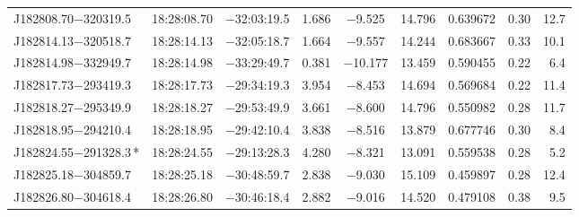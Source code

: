 \begin{table*}
\begin{tabular}{lcccccccr}
J182808.70$-$320319.5 & 18:28:08.70 & $-$32:03:19.5 &  1.686 & $-$9.525 & 14.796 & 0.639672 & 0.30 & 12.7 \\
J182814.13$-$320518.7 & 18:28:14.13 & $-$32:05:18.7 &  1.664 & $-$9.557 & 14.244 & 0.683667 & 0.33 & 10.1 \\
J182814.98$-$332949.7 & 18:28:14.98 & $-$33:29:49.7 &  0.381 & $-$10.177 & 13.459 & 0.590455 & 0.22 & 6.4 \\
J182817.73$-$293419.3 & 18:28:17.73 & $-$29:34:19.3 &  3.954 & $-$8.453 & 14.694 & 0.569684 & 0.22 & 11.4 \\
J182818.27$-$295349.9 & 18:28:18.27 & $-$29:53:49.9 &  3.661 & $-$8.600 & 14.796 & 0.550982 & 0.28 & 11.7 \\
J182818.95$-$294210.4 & 18:28:18.95 & $-$29:42:10.4 &  3.838 & $-$8.516 & 13.879 & 0.677746 & 0.30 & 8.4 \\
J182824.55$-$291328.3\,* & 18:28:24.55 & $-$29:13:28.3 &  4.280 & $-$8.321 & 13.091 & 0.559538 & 0.28 & 5.2 \\
J182825.18$-$304859.7 & 18:28:25.18 & $-$30:48:59.7 &  2.838 & $-$9.030 & 15.109 & 0.459897 & 0.28 & 12.4 \\
J182826.80$-$304618.4 & 18:28:26.80 & $-$30:46:18.4 &  2.882 & $-$9.016 & 14.520 & 0.479108 & 0.38 & 9.5 \\
\hline
\end{tabular}
\end{table*}

\addtocounter{table}{-1}


